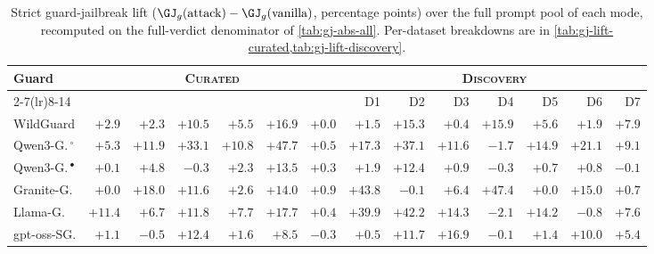 \begin{table}[htbp]
\caption{\NEWr Strict guard-jailbreak lift ($\GJ_g(\text{attack}) - \GJ_g(\text{vanilla})$, percentage points) over the full prompt pool of each mode, recomputed on the full-verdict denominator of \cref{tab:gj-abs-all}. Per-dataset breakdowns are in \cref{tab:gj-lift-curated,tab:gj-lift-discovery}.}
\label{tab:gj-lift-all}
\centering\scriptsize
\setlength{\tabcolsep}{2pt}
\begin{tabular}{@{}l rrrrrr rrrrrrr@{}}
\toprule
Guard & \multicolumn{6}{c}{\textsc{Curated}} & \multicolumn{7}{c}{\textsc{Discovery}} \\
\cmidrule(lr){2-7}\cmidrule(lr){8-14}
 & \attFITD{} & \attLogi{} & \attBit{} & \attResp{} & \attReNe{} & \attHum{} & D1 & D2 & D3 & D4 & D5 & D6 & D7 \\
\midrule
WildGuard & $+2.9$ & $+2.3$ & $+10.5$ & $+5.5$ & $+16.9$ & $+0.0$ & $+1.5$ & $+15.3$ & $+0.4$ & $+15.9$ & $+5.6$ & $+1.9$ & $+7.9$ \\
Qwen3-G.\,$^{\circ}$ & $+5.3$ & $+11.9$ & $+33.1$ & $+10.8$ & $+47.7$ & $+0.5$ & $+17.3$ & $+37.1$ & $+11.6$ & $-1.7$ & $+14.9$ & $+21.1$ & $+9.1$ \\
Qwen3-G.\,$^{\bullet}$ & $+0.1$ & $+4.8$ & $-0.3$ & $+2.3$ & $+13.5$ & $+0.3$ & $+1.9$ & $+12.4$ & $+0.9$ & $-0.3$ & $+0.7$ & $+0.8$ & $-0.1$ \\
Granite-G. & $+0.0$ & $+18.0$ & $+11.6$ & $+2.6$ & $+14.0$ & $+0.9$ & $+43.8$ & $-0.1$ & $+6.4$ & $+47.4$ & $+0.0$ & $+15.0$ & $+0.7$ \\
Llama-G. & $+11.4$ & $+6.7$ & $+11.8$ & $+7.7$ & $+17.7$ & $+0.4$ & $+39.9$ & $+42.2$ & $+14.3$ & $-2.1$ & $+14.2$ & $-0.8$ & $+7.6$ \\
\midrule
gpt-oss-SG. & $+1.1$ & $-0.5$ & $+12.4$ & $+1.6$ & $+8.5$ & $-0.3$ & $+0.5$ & $+11.7$ & $+16.9$ & $-0.1$ & $+1.4$ & $+10.0$ & $+5.4$ \\
\bottomrule
\end{tabular}

\end{table}
